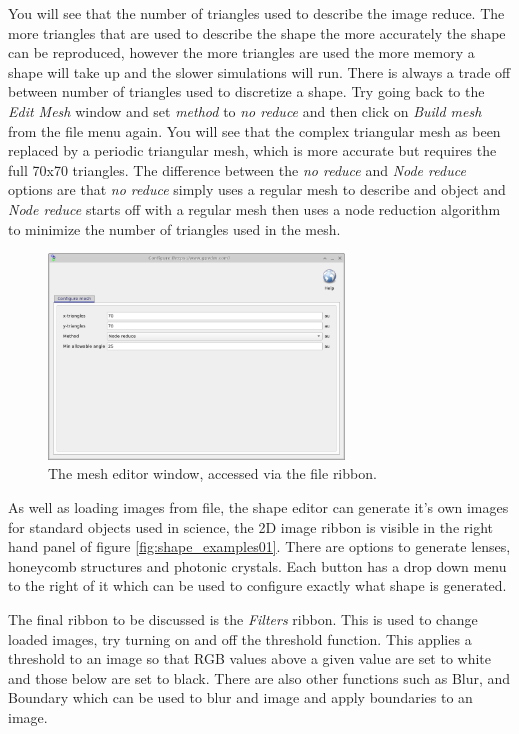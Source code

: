You will see that the number of triangles used to describe the image reduce.  The more triangles that are used to describe the shape the more accurately the shape can be reproduced, however the more triangles are used the more memory a shape will take up and the slower simulations will run.  There is always a trade off between number of triangles used to discretize a shape. Try going back to the \emph{Edit Mesh} window and set \emph{method} to \emph{no reduce} and then click on \emph{Build mesh} from the file menu again.  You will see that the complex triangular mesh as been replaced by a periodic triangular mesh, which is more accurate but requires the full 70x70 triangles.  The difference between the \emph{no reduce} and \emph{Node reduce} options are that \emph{no reduce} simply uses a regular mesh to describe and object and \emph{Node reduce} starts off with a regular mesh then uses a node reduction algorithm to minimize the number of triangles used in the mesh.

\begin{figure}[H]
\centering
\includegraphics[width=0.7\textwidth]{./images/database_shapes/config_window.png}
\caption{The mesh editor window, accessed via the file ribbon.}
\label{fig:shapedb_config_window}
\end{figure}

As well as loading images from file, the shape editor can generate it's own images for standard objects used in science, the 2D image ribbon is visible in the right hand panel of figure \ref{fig:shape_examples01}.   There are options to generate lenses, honeycomb structures and photonic crystals. Each button has a drop down menu to the right of it which can be used to configure exactly what shape is generated.

The final ribbon to be discussed is the \emph{Filters} ribbon. This is used to change loaded images, try turning on and off the threshold function.  This applies a threshold to an image so that RGB values above a given value are set to white and those below are set to black.  There are also other functions such as Blur, and Boundary which can be used to blur and image and apply boundaries to an image.

